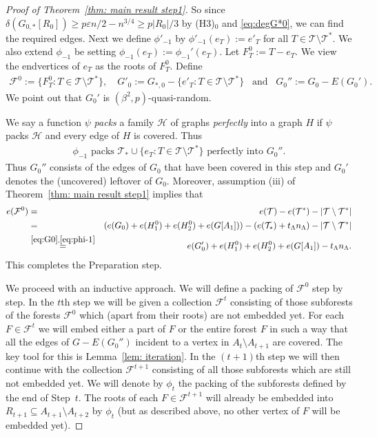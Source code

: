 \documentclass[a4paper, 11pt, reqno]{amsart}
\numberwithin{equation}{section}
\newcommand{\1}{{\rm 1\hspace*{-0.4ex}%
\rule{0.1ex}{1.52ex}\hspace*{0.2ex}}}
\newcommand{\cF}{\mathcal{F}}
\newcommand{\cT}{\mathcal{T}}
\newcommand{\cH}{\mathcal{H}}
\renewcommand{\epsilon}{\varepsilon}
\newcommand{\sm}{\setminus}
\newcommand{\sub}{\subseteq}
\newcounter{step}
\begin{document}
\begin{proof}[Proof of Theorem~\ref{thm: main result step1}]
{So since $\delta(G_{0,*}[R_0])\geq p \epsilon n/2 - n^{3/4}\geq p|R_0|/3$ by (H3)$_0$ and \eqref{eq:degG*0},
we can find the required edges.
}
Next we define $\phi'_{-1}$ by $\phi'_{-1}(e_T) :=e'_T$ for all $T\in \cT\setminus \cT^*$.
We also extend $\phi_{-1}$ be setting $\phi_{-1}(e_T):=\phi_{-1}'(e_T)$.
Let $F^0_T:= T-e_T$.
We view the endvertices of $e_T$ as the roots of $F_T^0$.
Define 
\begin{align}\label{eq:G0}
	\cF^0:=\{F^0_T: T\in \cT\setminus \cT^*\}, \quad
	G'_0:= G_{*,0} - \{e'_T: T\in \cT\sm \cT^*\}\enspace \text{ and } \enspace
	G_0'':=G_0-E(G_0'). 
\end{align}
We point out that $G_0'$ is $(\beta^2,p)$-quasi-random.

We say a function $\psi$ \emph{packs} a family $\cH$ of graphs \emph{perfectly} into a graph $H$
if $\psi$ packs $\cH$ and every edge of $H$ is covered.
Thus
\begin{align}\label{eq:phi-1}
	\phi_{-1} \text{ packs } \cT_*\cup \{e_T:T\in \cT\sm \cT^*\} \text{ perfectly into } G_0''.
\end{align}
Thus $G_0''$ consists of the edges of $G_0$ that have been covered in this step and $G_0'$ denotes the (uncovered) leftover of $G_0$.
Moreover, assumption (iii) of Theorem~\ref{thm: main result step1} implies that 
\begin{eqnarray*}
	e(\cF^0)
	&= &e(\cT)-e(\cT^*)- |\cT\sm \cT^*|\\
	&= & (e(G_0)+e(H^0_1) + e(H^0_2)+ e(G[A_1]))- (e(\cT_*)+ t_{\Lambda}n_{\Lambda})- |\cT\sm \cT^*|\\
	&\stackrel{\eqref{eq:G0},\eqref{eq:phi-1}}{=} &e(G'_0)+ e(H^0_1) + e(H^0_2) + e(G[A_1])- t_{\Lambda}n_{\Lambda}.
\end{eqnarray*}
This completes the Preparation step.

\medskip

We proceed with an inductive approach. 
We will define a packing of $\cF^0$ step by step.
In the $t$th step we will be given a collection $\cF^t$ consisting of those subforests of the forests $\cF^0$ 
which (apart from their roots) are not embedded yet.
For each $F\in \cF^t$ we will embed either a part of $F$ or the entire forest $F$
in such a way that all the edges of $G-E(G_0'')$ incident to a vertex in $A_t\sm A_{t+1}$ are covered.
The key tool for this is Lemma~\ref{lem: iteration}.
In the $(t+1)$th step
we will then continue with the collection $\cF^{t+1}$ consisting of all those subforests which are still not embedded yet.
We will denote by $\phi_t$ the packing of the subforests defined by the end of Step~$t$.
The roots of each $F\in\cF^{t+1}$ will already be embedded into $R_{t+1}\sub A_{t+1}\sm A_{t+2}$ by $\phi_{t}$
(but as described above, no other vertex of $F$ will be embedded yet).




\end{proof}
\end{document}

